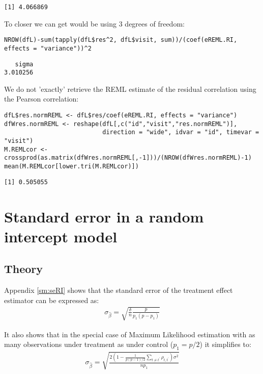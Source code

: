 \documentclass[12pt]{article}
\begin{document}
\begin{verbatim}
[1] 4.066869
\end{verbatim}


To closer we can get would be using 3 degrees of freedom:
\lstset{language=r,label= ,caption= ,captionpos=b,numbers=none}
\begin{lstlisting}
NROW(dfL)-sum(tapply(dfL$res^2, dfL$visit, sum))/(coef(eREML.RI, effects = "variance"))^2
\end{lstlisting}

\begin{verbatim}
   sigma 
3.010256
\end{verbatim}



We do not 'exactly' retrieve the REML estimate of the residual
correlation using the Pearson correlation:
\lstset{language=r,label= ,caption= ,captionpos=b,numbers=none}
\begin{lstlisting}
dfL$res.normREML <- dfL$res/coef(eREML.RI, effects = "variance")
dfWres.normREML <- reshape(dfL[,c("id","visit","res.normREML")],
                           direction = "wide", idvar = "id", timevar = "visit")
M.REMLcor <- crossprod(as.matrix(dfWres.normREML[,-1]))/(NROW(dfWres.normREML)-1)
mean(M.REMLcor[lower.tri(M.REMLcor)])
\end{lstlisting}

\begin{verbatim}
[1] 0.505055
\end{verbatim}


\clearpage

\section{Standard error in a random intercept model}
\label{sec:org2740393}

\subsection{Theory}
\label{sec:orga5fb5ed}

Appendix \ref{sm:seRI} shows that the standard error of the treatment
effect estimator can be expressed as:
\begin{align*}
\sigma_{\widehat{\beta}} =\sqrt{\frac{\delta}{n} \frac{p}{p_1(p-p_1)}}
\end{align*}

It also shows that in the special case of Maximum Likelihood
estimation with as many observations under treatment as under control
(\(p_1=p/2\)) it simplifies to:
\begin{align}
\sigma_{\widehat{\beta}} = \sqrt{\frac{2\left(1-\frac{1}{p(p-1)/2}\sum_{t \neq t^{\prime}} \rho_{t,t^{\prime}}\right) \sigma^2}{n p_1}} \label{eq:seML}
\end{align}
\end{document}
